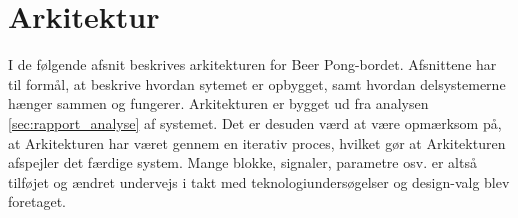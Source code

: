 \documentclass[Rapport/Rapport_main.tex]{subfiles}
\begin{document}
\section{Arkitektur}
I de følgende afsnit beskrives arkitekturen for Beer Pong-bordet. Afsnittene har til formål, at beskrive hvordan sytemet er opbygget, samt hvordan delsystemerne hænger sammen og fungerer. Arkitekturen er bygget ud fra analysen \ref{sec:rapport_analyse} af systemet. Det er desuden værd at være opmærksom på, at Arkitekturen har været gennem en iterativ proces, hvilket gør at Arkitekturen afspejler det  færdige system. Mange blokke, signaler, parametre osv. er altså tilføjet og ændret undervejs i takt med teknologiundersøgelser og design-valg blev foretaget.


\newpage

\newpage

\newpage

\newpage

\end{document}
